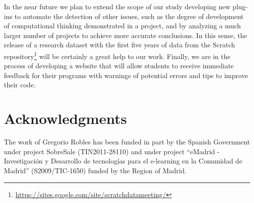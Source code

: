\documentclass[conference]{format/IEEEtran}
\begin{document}
In the near future we plan to extend the scope of our study developing new plug-ins to automate the detection of other issues, such as the degree of development of computational thinking demonstrated in a project, and by analyzing a much larger number of projects to achieve more accurate conclusions. In this sense, the release of a research dataset with the first five years of data from the Scratch repository\footnote{\url{https://sites.google.com/site/scratchdatameeting/}} will be certainly a great help to our work. Finally, we are in the process of developing a website that will allow students to receive immediate feedback for their programs with warnings of potential errors and tips to improve their code.

\section*{Acknowledgments}

The work of Gregorio Robles has
been funded in part by the Spanish Government under project 
SobreSale (TIN2011-28110) and under project ``eMadrid - Investigación y Desarrollo de tecnologías para el e-learning en la Comunidad de Madrid'' (S2009/TIC-1650) funded by the Region of Madrid.



\end{document}
